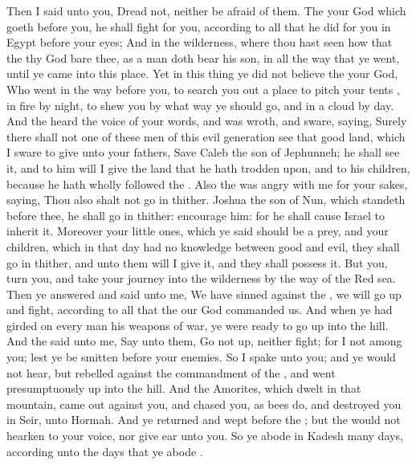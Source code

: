 {Then I
said unto you,
Dread not, neither be
afraid of them.
The
{} your
God which
goeth
before you, he shall
fight for you, according to all that he
did for you in
Egypt before your
eyes;
And in the
wilderness, where thou hast
seen how that the
{} thy
God
bare thee, as a
man doth
bear his
son, in all the
way that ye
went, until ye
came into this
place.
Yet in this
thing ye did not
believe the
{} your
God,
Who
went in the
way
before you, to search you
out a
place to pitch your
tents
{}, in
fire by
night, to
shew you by what
way ye should
go, and in a
cloud by
day.
And the
{}
heard the
voice of your
words, and was
wroth, and
sware,
saying,
Surely there shall not
one of these
men of this
evil
generation
see that
good
land, which I
sware to
give unto your
fathers,
Save
Caleb the
son of
Jephunneh; he shall
see it, and to him will I
give the
land
that he hath trodden
upon, and to his
children, because he hath
wholly
followed the
{}.
Also the
{} was
angry with me for your
sakes,
saying, Thou also shalt not
go in
thither.
Joshua the
son of
Nun, which
standeth
before thee, he shall go
in thither:
encourage him: for he shall cause
Israel to
inherit it.
Moreover your little
ones, which ye
said should be a
prey, and your
children, which in that
day had no
knowledge between
good and
evil, they shall go
in thither, and unto them will I
give it, and they shall
possess it.
But
{} you,
turn you, and take your
journey into the
wilderness by the
way of the
Red
sea.
Then ye
answered and
said unto me, We have
sinned against the
{}, we will go
up and
fight, according to all that the
{} our
God
commanded us. And when ye had
girded on every
man his
weapons of
war, ye were
ready to go
up into the
hill.
And the
{}
said unto me,
Say unto them, Go not
up, neither
fight; for I
{} not
among you; lest ye be
smitten
before your
enemies.
So I
spake unto you; and ye would not
hear, but
rebelled against the
commandment of the
{}, and
went
presumptuously
up into the
hill.
And the
Amorites, which
dwelt in that
mountain, came
out
against you, and
chased you, as
bees
do, and
destroyed you in
Seir,
{} unto
Hormah.
And ye
returned and
wept
before the
{}; but the
{} would not
hearken to your
voice, nor give
ear unto you.
So ye
abode in
Kadesh
many
days, according unto the
days that ye
abode
{}.

}
